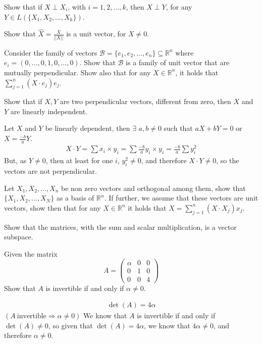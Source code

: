 \documentclass[answers]{exam}
\begin{document}
\begin{questions}
\question Show that if $X\perp X_i$, with $i=1,2,...,k$, then $X\perp Y$, for any $Y\in L(\{X_1,X_2,...,X_k\})$.

\question Show that $\hat{X}=\frac{X}{||X||}$ is a unit vector, for $X\neq0$.

\question Consider the family of vectors $\mathcal{B}=\{e_1,e_2,...,e_n\}\subseteq\mathbb{R}^n$ where $e_i = (0,...,0,1,0,...,0)$. Show that $\mathcal{B}$ is a family of unit vector that are mutually perpendicular. Show also that for any $X\in\mathbb{R}^n$, it holds that $\sum_{j=1}^n (X\cdot e_j)e_j$.

\question Show that if $X,Y$ are two perpendicular vectors, different from zero, then $X$ and $Y$ are linearly independent.

\begin{solution}
   Let $X$ and $Y$ be linearly dependent, then $\exists$ $a,b\neq0$ such that $aX+bY=0$ or $X=\frac{-b}{a}Y$. 
    \begin{align*}
        X\cdot Y = \sum x_i\times y_i = \sum \frac{-b}{a}y_i\times y_i = \frac{-b}{a}\sum y_i^2
    \end{align*}
    But, as $Y\neq0$, then at least for one $i$, $y_i^2\neq 0$, and therefore $X\cdot Y\neq 0$, so the vectors are not perpendicular.
\end{solution}

\question Let $X_1,X_2,...,X_n$ be non zero vectors and orthogonal among them, show that $\{X_1,X_2,...,X_N\}$ as a basis of $\mathbb{R}^n$. If further, we assume that these vectors are unit vectors, show then that for any $X\in\mathbb{R}^n$ it holds that $X=\sum_{j=1}^n (X\cdot X_j)x_j$.

\question Show that the matrices, with the sum and scalar multiplication, is a vector subspace.

\question Given the matrix $$A=\left(\begin{array}{ccc}\alpha&0&0\\0&1&0\\0&0&4\end{array}\right)$$ Show that $A$ is invertible if and only if $\alpha\neq 0$.

\begin{solution}
    \begin{align*}
        \det(A) = 4\alpha
    \end{align*}
    $(A\ \text{invertible}\Rightarrow \alpha\neq 0)$ We know that $A$ is invertible if and only if $\det(A)\neq 0$, so given that $\det(A)=4\alpha$, we know that $4\alpha\neq0$, and therefore $\alpha\neq 0$.
    

\end{solution}
\end{questions}
\end{document}
